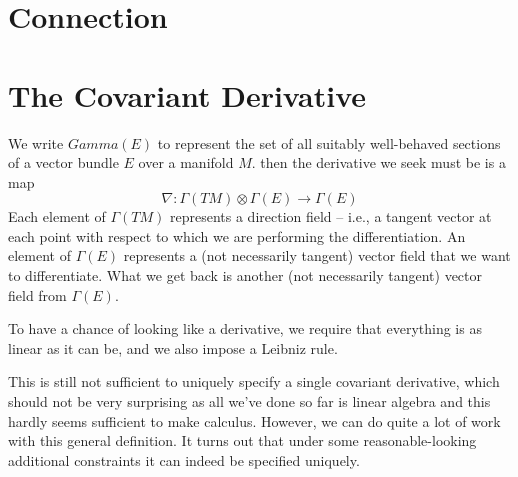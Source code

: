 \documentclass[oneside,english]{amsbook}
\numberwithin{section}{chapter}
\theoremstyle{plain}
\theoremstyle{definition}
\begin{document}
\section{Connection}



\section{The Covariant Derivative}

We write $Gamma(E)$ to represent the set of all suitably well-behaved sections of a vector bundle $E$ over a manifold $M$. then the derivative we seek must be is a map
\[
	\nabla:\Gamma(TM)\otimes\Gamma(E)\to\Gamma(E)
\]
Each element of $\Gamma(TM)$ represents a direction field -- i.e., a tangent vector at each point with respect to which we are performing the differentiation. An element of $\Gamma(E)$ represents a (not necessarily tangent) vector field that we want to differentiate. What we get back is another (not necessarily tangent) vector field from $\Gamma(E)$.

To have a chance of looking like a derivative, we require that everything is as linear as it can be, and we also impose a Leibniz rule. 

This is still not sufficient to uniquely specify a single covariant derivative, which should not be very surprising as all we've done so far is linear algebra and this hardly seems sufficient to make calculus. However, we can do quite a lot of work with this general definition. It turns out that under some reasonable-looking additional constraints it can indeed be specified uniquely.
\end{document}
